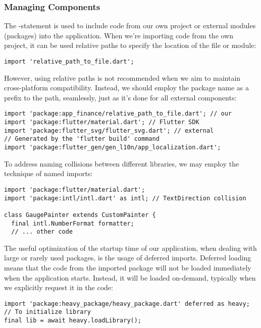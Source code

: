 \newpage
\subsubsection{Managing Components}

The -statement is used to include code from our own project or external modules (packages) into the 
application. When we're importing code from the own project, it can be used relative paths to specify the location of 
the file or module:

\begin{lstlisting}
import 'relative_path_to_file.dart';
\end{lstlisting}

\noindent However, using relative paths is not recommended when we aim to maintain cross-platform compatibility. 
Instead, we should employ the package name as a prefix to the path, seamlessly, just as it's done for all external 
components:

\begin{lstlisting}
import 'package:app_finance/relative_path_to_file.dart'; // our
import 'package:flutter/material.dart'; // Flutter SDK
import 'package:flutter_svg/flutter_svg.dart'; // external
// Generated by the 'flutter build' command
import 'package:flutter_gen/gen_l10n/app_localization.dart';
\end{lstlisting}

\noindent To address naming collisions between different libraries, we may employ the technique of named imports:

\begin{lstlisting}
import 'package:flutter/material.dart';
import 'package:intl/intl.dart' as intl; // TextDirection collision

class GaugePainter extends CustomPainter {
  final intl.NumberFormat formatter;
  // ... other code
\end{lstlisting}

\noindent The useful optimization of the startup time of our application, when dealing with large or rarely used 
packages, is the usage of deferred imports. Deferred loading means that the code from the imported package will not be 
loaded immediately when the application starts. Instead, it will be loaded on-demand, typically when we explicitly 
request it in the code:

\begin{lstlisting}
import 'package:heavy_package/heavy_package.dart' deferred as heavy;
// To initialize library
final lib = await heavy.loadLibrary();
\end{lstlisting}

